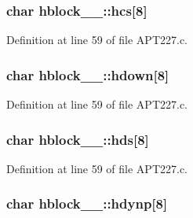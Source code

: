\subsubsection[{\texorpdfstring{hcs}{hcs}}]{\setlength{\rightskip}{0pt plus 5cm}char hblock\+\_\+\_\+\+::hcs\mbox{[}8\mbox{]}}\hypertarget{structhblock__1___ad66eb3b47332bf61d0ff0db49bdfb3d7}{}\label{structhblock__1___ad66eb3b47332bf61d0ff0db49bdfb3d7}


Definition at line 59 of file A\+P\+T227.\+c.

\subsubsection[{\texorpdfstring{hdown}{hdown}}]{\setlength{\rightskip}{0pt plus 5cm}char hblock\+\_\+\_\+\+::hdown\mbox{[}8\mbox{]}}\hypertarget{structhblock__1___a7143e624c8dd1fe2e9f957c2c687e8e3}{}\label{structhblock__1___a7143e624c8dd1fe2e9f957c2c687e8e3}


Definition at line 59 of file A\+P\+T227.\+c.

\subsubsection[{\texorpdfstring{hds}{hds}}]{\setlength{\rightskip}{0pt plus 5cm}char hblock\+\_\+\_\+\+::hds\mbox{[}8\mbox{]}}\hypertarget{structhblock__1___ab33cb6933abdacdc030e505b91470de1}{}\label{structhblock__1___ab33cb6933abdacdc030e505b91470de1}


Definition at line 59 of file A\+P\+T227.\+c.

\subsubsection[{\texorpdfstring{hdynp}{hdynp}}]{\setlength{\rightskip}{0pt plus 5cm}char hblock\+\_\+\_\+\+::hdynp\mbox{[}8\mbox{]}}\hypertarget{structhblock__1___ad1459eb479fc1ac9cc503ff1492b9e94}{}\label{structhblock__1___ad1459eb479fc1ac9cc503ff1492b9e94}


